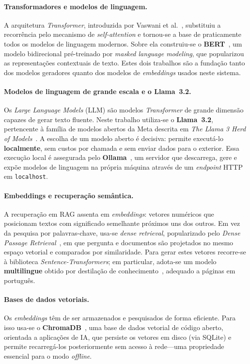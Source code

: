 \documentclass[]{ceurart}
\begin{document}
\paragraph{Transformadores e modelos de linguagem.}
A arquitetura \emph{Transformer}, introduzida por Vaswani et
al.~\cite{vaswani2017attention}, substituiu a recorrência pelo mecanismo de
\emph{self-attention} e tornou-se a base de praticamente todos os modelos de
linguagem modernos. Sobre ela construiu-se o \textbf{BERT}~\cite{devlin2019bert},
um modelo bidirecional pré-treinado por \emph{masked language modeling}, que
popularizou as representações contextuais de texto. Estes dois trabalhos são a
fundação tanto dos modelos geradores quanto dos modelos de \emph{embeddings}
usados neste sistema.

\paragraph{Modelos de linguagem de grande escala e o Llama~3.2.}
Os \emph{Large Language Models} (LLM) são modelos \emph{Transformer} de grande
dimensão capazes de gerar texto fluente. Neste trabalho utiliza-se o
\textbf{Llama~3.2}, pertencente à família de modelos abertos da Meta descrita
em \emph{The Llama 3 Herd of Models}~\cite{llama3}. A escolha de um modelo aberto
é decisiva: permite executá-lo \textbf{localmente}, sem custos por chamada e sem
enviar dados para o exterior. Essa execução local é assegurada pelo
\textbf{Ollama}~\cite{ollama}, um servidor que descarrega, gere e expõe modelos
de linguagem na própria máquina através de um \emph{endpoint} HTTP em
\texttt{localhost}.

\paragraph{Embeddings e recuperação semântica.}
A recuperação em RAG assenta em \emph{embeddings}: vetores numéricos que
posicionam textos com significado semelhante próximos uns dos outros. Em vez da
pesquisa por palavras-chave, usa-se \emph{dense retrieval}, popularizado pelo
\emph{Dense Passage Retrieval}~\cite{karpukhin2020dpr}, em que pergunta e
documentos são projetados no mesmo espaço vetorial e comparados por similaridade.
Para gerar estes vetores recorre-se à biblioteca \emph{Sentence-Transformers};
em particular, adota-se um modelo \textbf{multilingue} obtido por destilação de
conhecimento~\cite{reimers2020multilingual}, adequado a páginas em português.

\paragraph{Bases de dados vetoriais.}
Os \emph{embeddings} têm de ser armazenados e pesquisados de forma eficiente.
Para isso usa-se o \textbf{ChromaDB}~\cite{chromadb}, uma base de dados vetorial
de código aberto, orientada a aplicações de IA, que persiste os vetores em disco
(via SQLite) e permite recarregá-los posteriormente sem acesso à rede---uma
propriedade essencial para o modo \emph{offline}.
\end{document}
